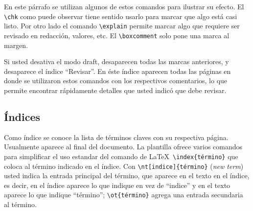 En este párrafo se utilizan algunos de estos comandos
para ilustrar su efecto.  El \verb+\chk+ como puede observar tiene sentido
usarlo para marcar que algo está casi listo.  Por otro lado 
el comando \verb+\explain+ permite marcar algo que requiere ser revisado en
redacción, valores, etc.  El \verb+\boxcomment+
solo pone una marca al margen.


Si usted desativa el modo draft, desaparecen todas las marcas
anteriores, y desaparece el índice ``Revisar''.  En éste índice
aparecen todas las páginas en donde se utilizaron estos comandos con
los respectivos comentarios, lo que permite encontrar rápidamente
detalles que usted indicó que debe revisar.

\subsection{Índices}

Como índice se conoce la lista de términos claves con su respectiva
página.  Usualmente aparece al final del documento.  La plantilla
ofrece varios comandos para simplificar el uso estandar del comando de
\LaTeX\ \verb+\index{término}+ que coloca al término indicado en el
índice.  Con \verb+\nt[indice]{término}+ (\emph{new term}) usted
indica la entrada principal del término, que aparece en el texto en el
índice, es decir, en el índice aparece lo que indique en vez de
``indice'' y en el texto aparece lo que indique ``término'';
\verb+\ot{término}+ agrega una entrada secundaria al término.
